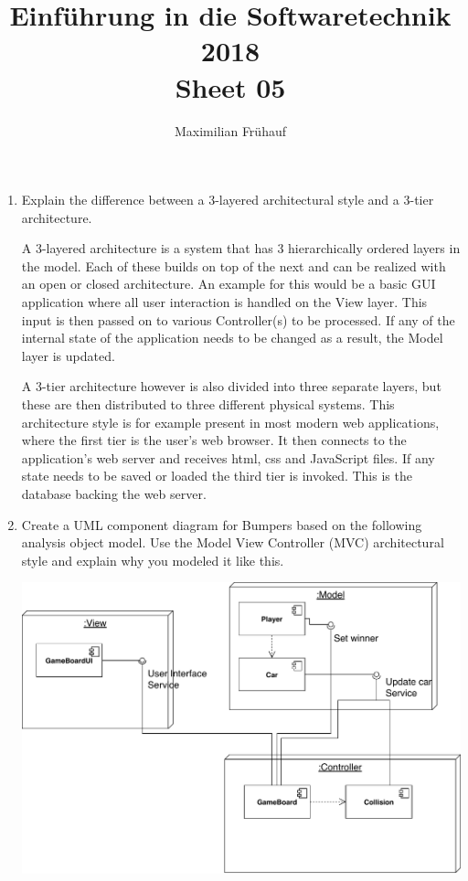 \documentclass[a4paper, 10pt]{article}
\title{Einführung in die Softwaretechnik 2018 \\ Sheet 05}
\author{Maximilian Frühauf}
\begin{document}
\maketitle
\begin{enumerate}
    \item
    Explain the difference between a 3-layered architectural style and a 3-tier architecture.
    \vspace{0.5cm}

    A 3-layered architecture is a system that has 3 hierarchically ordered layers in the model.
    Each of these builds on top of the next and can be realized with an open or closed architecture.
    An example for this would be a basic GUI application where all user interaction is handled on the 
    View layer. This input is then passed on to various Controller(s) to be processed. If any of the 
    internal state of the application needs to be changed as a result, the Model layer is updated.


    A 3-tier architecture however is also divided into three separate layers, but these are then 
    distributed to three different physical systems.
    This architecture style is for example present in most modern web applications, where the first 
    tier is the user's web browser. It then connects to the application's web server and 
    receives html, css and JavaScript files. If any state needs to be saved or loaded the 
    third tier is invoked. This is the database backing the web server.
    \item
    Create a UML component diagram for Bumpers based on the following analysis object model. 
    Use the Model View Controller (MVC) architectural style and explain why you modeled it like this.
    \vspace{0.5cm}
    
    \includegraphics[width=\linewidth]{task2.pdf}



\end{enumerate}
\end{document}

